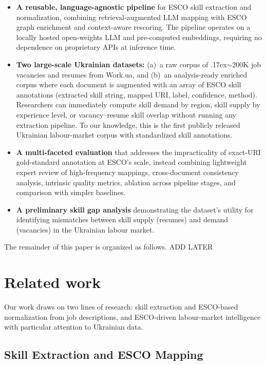 \documentclass[11pt]{article}
\begin{document}
\begin{itemize}

\item \textbf{A reusable, language-agnostic pipeline} for ESCO skill extraction and normalization, combining retrieval-augmented LLM mapping with ESCO graph enrichment and context-aware rescoring. The pipeline operates on a locally hosted open-weights LLM and pre-computed embeddings, requiring no dependence on proprietary APIs at inference time.

\item \textbf{Two large-scale Ukrainian datasets:} (a)~a raw corpus of {\raise.17ex\hbox{$\scriptstyle\sim$}}200K job vacancies and resumes from Work.ua, and (b)~an analysis-ready enriched corpus where each document is augmented with an array of ESCO skill annotations (extracted skill string, mapped URI, label, confidence, method). Researchers can immediately compute skill demand by region, skill supply by experience level, or vacancy--resume skill overlap without running any extraction pipeline. To our knowledge, this is the first publicly released Ukrainian labour-market corpus with standardized skill annotations.

\item \textbf{A multi-faceted evaluation} that addresses the impracticality of exact-URI gold-standard annotation at ESCO's scale, instead combining lightweight expert review of high-frequency mappings, cross-document consistency analysis, intrinsic quality metrics, ablation across pipeline stages, and comparison with simpler baselines.

\item \textbf{A preliminary skill gap analysis} demonstrating the dataset's utility for identifying mismatches between skill supply (resumes) and demand (vacancies) in the Ukrainian labour market.

\end{itemize}
The remainder of this paper is organized as follows. ADD LATER


\section{Related work}
\label{sec:related}


Our work draws on two lines of research: skill extraction and ESCO-based normalization from job descriptions, and ESCO-driven labour-market intelligence with particular attention to Ukrainian data.

\subsection{Skill Extraction and ESCO Mapping}
\label{sec:related-mapping}
\end{document}
